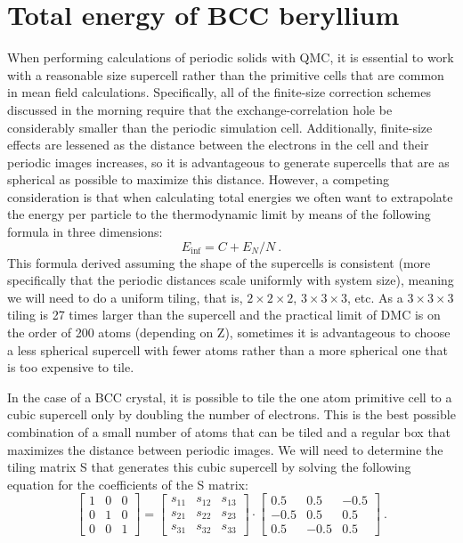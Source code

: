 \section{Total energy of BCC beryllium}

When performing calculations of periodic solids with QMC, it is essential to work with a reasonable size supercell rather than the primitive cells that are common in mean field calculations.  Specifically, all of the finite-size correction schemes discussed in the morning require that the exchange-correlation hole be considerably smaller than the periodic simulation cell.  Additionally, finite-size effects are lessened as the distance between the electrons in the cell and their periodic images increases, so it is advantageous to generate supercells that are as spherical as possible to maximize this distance.  However, a competing consideration is that when calculating total energies we often want to extrapolate the energy per particle to the thermodynamic limit by means of the following formula in three dimensions:
\begin{equation}
E_{\inf} = C + E_{N}/N\:.
\end{equation}
This formula derived assuming the shape of the supercells is consistent (more specifically that the periodic distances scale uniformly with system size), meaning we will need to do a uniform tiling, that is, $2\times2\times2$, $3\times3\times3$, etc.  As a $3\times3\times3$ tiling is 27 times larger than the supercell and the practical limit of DMC is on the order of 200 atoms (depending on Z), sometimes it is advantageous to choose a less spherical supercell with fewer atoms rather than a more spherical one that is too expensive to tile.

In the case of a BCC crystal, it is possible to tile the one atom primitive cell to a cubic supercell only by doubling the number of electrons.  This is the best possible combination of a small number of atoms that can be tiled and a regular box that maximizes the distance between periodic images.  We will need to determine the tiling matrix S that generates this cubic supercell by solving the following equation for the coefficients of the S matrix:
\begin{equation}
 \left[\begin{array}{rrr}
  1 & 0 & 0 \\
  0 & 1 & 0 \\
  0 & 0 & 1 
  \end{array}\right] =  \left[\begin{array}{rrr}
  s_{11} & s_{12} & s_{13} \\
  s_{21} & s_{22} & s_{23} \\
  s_{31} & s_{32} & s_{33} 
  \end{array}\right] \cdot 
\left[\begin{array}{rrr}
  0.5 &  0.5 & -0.5 \\
 -0.5 &  0.5 &  0.5 \\
  0.5 & -0.5 &  0.5
\end{array}\right]\:. 
\end{equation}

